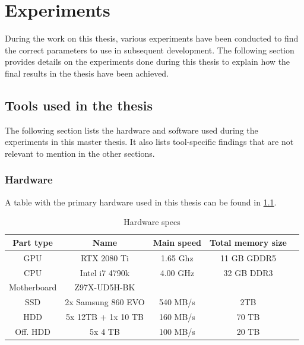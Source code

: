 \chapter{Experiments}

During the work on this thesis, various experiments have been conducted to find the correct parameters to use in subsequent development.
The following section provides details on the experiments done during this thesis to explain how the final results in the thesis have been achieved.



\section{Tools used in the thesis}
The following section lists the hardware and software used during the experiments in this master thesis.
It also lists tool-specific findings that are not relevant to mention in the other sections.

\subsection{Hardware}
\label{chex:hardware}

A table with the primary hardware used in this thesis can be found in \cref{tab:hardware}.

\begin{table}[ht]
    \centering
    \begin{tabular}{|c|c|c|c|c|}
        \hline
        Part type & Name & Main speed & Total memory size\\ \hline
        GPU & RTX 2080 Ti & 1.65 Ghz & 11 GB GDDR5\\ \hline
        CPU & Intel i7 4790k & 4.00 GHz & 32 GB DDR3\\ \hline
        Motherboard & Z97X-UD5H-BK & & \\ \hline
        SSD & 2x Samsung 860 EVO & 540 MB/s & 2TB \\ \hline
        HDD & 5x 12TB + 1x 10 TB & 160 MB/s & 70 TB \\ \hline
        Off. HDD & 5x 4 TB & 100 MB/s & 20 TB \\ \hline
        
    \end{tabular}
    \caption{Hardware specs}
    \label{tab:hardware}
\end{table}

